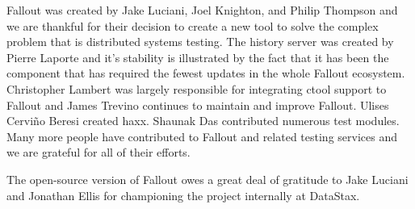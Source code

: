 \documentclass[a4paper,fleqn]{cas-dc}
\begin{document}
Fallout was created by Jake Luciani, Joel Knighton, and Philip Thompson and we are thankful for
their decision to create a new tool to solve the complex problem that is distributed systems
testing. The history server was created by Pierre Laporte and it’s stability is illustrated by the
fact that it has been the component that has required the fewest updates in the whole Fallout
ecosystem. Christopher Lambert was largely responsible for integrating ctool support to Fallout and
James Trevino continues to maintain and improve Fallout. Ulises Cerviño Beresi created haxx. Shaunak Das contributed numerous test
modules. Many more people have contributed to Fallout and related testing services and we are
grateful for all of their efforts.

The open-source version of Fallout owes a great deal of gratitude to Jake Luciani and Jonathan Ellis
for championing the project internally at DataStax.

%





\end{document}

